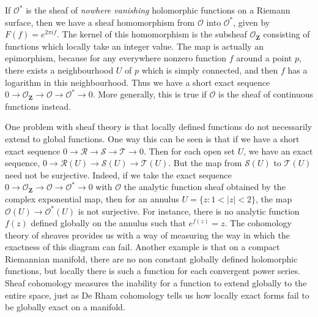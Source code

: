 \begin{example}
    If $\mathcal{O}^*$ is the sheaf of {\it nowhere vanishing} holomorphic functions on a Riemann surface, then we have a sheaf homomorphism from $\mathcal{O}$ into $\mathcal{O}^*$, given by $F(f) = e^{2 \pi i f}$. The kernel of this homomorphism is the subsheaf $\mathcal{O}_{\mathbf{Z}}$ consisting of functions which locally take an integer value. The map is actually an epimorphism, because for any everywhere nonzero function $f$ around a point $p$, there exists a neighbourhood $U$ of $p$ which is simply connected, and then $f$ has a logarithm in this neighbourhood. Thus we have a short exact sequence $0 \to \mathcal{O}_{\mathbf{Z}} \to \mathcal{O} \to \mathcal{O}^* \to 0$. More generally, this is true if $\mathcal{O}$ is the sheaf of continuous functions instead.
\end{example}

One problem with sheaf theory is that locally defined functions do not necessarily extend to global functions. One way this can be seen is that if we have a short exact sequence $0 \to \mathcal{R} \to \mathcal{S} \to \mathcal{T} \to 0$. Then for each open set $U$, we have an exact sequence, $0 \to \mathcal{R}(U) \to \mathcal{S}(U) \to \mathcal{T}(U)$. But the map from $\mathcal{S}(U)$ to $\mathcal{T}(U)$ need not be surjective. Indeed, if we take the exact sequence $0 \to \mathcal{O}_{\mathbf{Z}} \to \mathcal{O} \to \mathcal{O}^* \to 0$ with $\mathcal{O}$ the analytic function sheaf obtained by the complex exponential map, then for an annulus $U = \{ z : 1 < |z| < 2 \}$, the map $\mathcal{O}(U) \to \mathcal{O}^*(U)$ is not surjective. For instance, there is no analytic function $f(z)$ defined globally on the annulus such that $e^{f(z)} = z$. The cohomology theory of sheaves provides us with a way of measuring the way in which the exactness of this diagram can fail. Another example is that on a compact Riemannian manifold, there are no non constant globally defined holomorphic functions, but locally there is such a function for each convergent power series. Sheaf cohomology measures the inability for a function to extend globally to the entire space, just as De Rham cohomology tells us how locally exact forms fail to be globally exact on a manifold.

